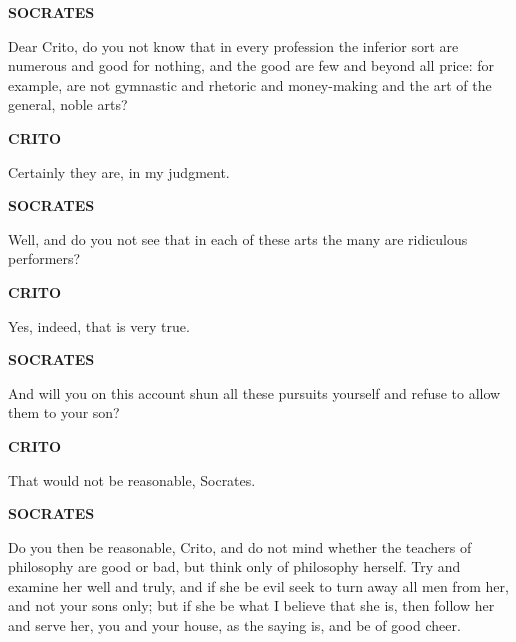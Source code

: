 \documentclass[11pt,letter]{article}
\begin{document}
\par \textbf{SOCRATES}
\par   Dear Crito, do you not know that in every profession the inferior sort are numerous and good for nothing, and the good are few and beyond all price:  for example, are not gymnastic and rhetoric and money-making and the art of the general, noble arts?

\par \textbf{CRITO}
\par   Certainly they are, in my judgment.

\par \textbf{SOCRATES}
\par   Well, and do you not see that in each of these arts the many are ridiculous performers?

\par \textbf{CRITO}
\par   Yes, indeed, that is very true.

\par \textbf{SOCRATES}
\par   And will you on this account shun all these pursuits yourself and refuse to allow them to your son?

\par \textbf{CRITO}
\par   That would not be reasonable, Socrates.

\par \textbf{SOCRATES}
\par   Do you then be reasonable, Crito, and do not mind whether the teachers of philosophy are good or bad, but think only of philosophy herself. Try and examine her well and truly, and if she be evil seek to turn away all men from her, and not your sons only; but if she be what I believe that she is, then follow her and serve her, you and your house, as the saying is, and be of good cheer.

\par 
 
\end{document}

